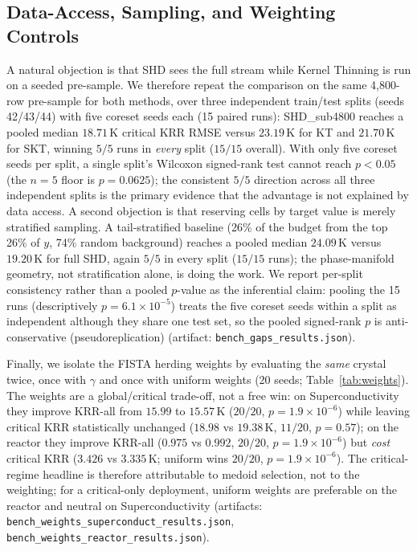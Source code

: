\documentclass[11pt,a4paper]{article}
\begin{document}
\subsection{Data-Access, Sampling, and Weighting Controls}

A natural objection is that SHD sees the full stream while Kernel Thinning is run on a seeded pre-sample. We therefore repeat the comparison on the same 4{,}800-row pre-sample for both methods, over three independent train/test splits (seeds 42/43/44) with five coreset seeds each (15 paired runs): SHD\_sub4800 reaches a pooled median $18.71\,\mathrm{K}$ critical KRR RMSE versus $23.19\,\mathrm{K}$ for KT and $21.70\,\mathrm{K}$ for SKT, winning $5/5$ runs in \emph{every} split ($15/15$ overall). With only five coreset seeds per split, a single split's Wilcoxon signed-rank test cannot reach $p<0.05$ (the $n=5$ floor is $p=0.0625$); the consistent $5/5$ direction across all three independent splits is the primary evidence that the advantage is not explained by data access. A second objection is that reserving cells by target value is merely stratified sampling. A tail-stratified baseline (26\% of the budget from the top 26\% of $y$, 74\% random background) reaches a pooled median $24.09\,\mathrm{K}$ versus $19.20\,\mathrm{K}$ for full SHD, again $5/5$ in every split ($15/15$ runs); the phase-manifold geometry, not stratification alone, is doing the work. We report per-split consistency rather than a pooled $p$-value as the inferential claim: pooling the 15 runs (descriptively $p=6.1\times10^{-5}$) treats the five coreset seeds within a split as independent although they share one test set, so the pooled signed-rank $p$ is anti-conservative (pseudoreplication) (artifact: \texttt{bench\_gaps\_results.json}).

Finally, we isolate the FISTA herding weights by evaluating the \emph{same} crystal twice, once with $\gamma$ and once with uniform weights (20 seeds; Table~\ref{tab:weights}). The weights are a global/critical trade-off, not a free win: on Superconductivity they improve KRR-all from $15.99$ to $15.57\,\mathrm{K}$ ($20/20$, $p=1.9\times10^{-6}$) while leaving critical KRR statistically unchanged ($18.98$ vs $19.38\,\mathrm{K}$, $11/20$, $p=0.57$); on the reactor they improve KRR-all ($0.975$ vs $0.992$, $20/20$, $p=1.9\times10^{-6}$) but \emph{cost} critical KRR ($3.426$ vs $3.335\,\mathrm{K}$; uniform wins $20/20$, $p=1.9\times10^{-6}$). The critical-regime headline is therefore attributable to medoid selection, not to the weighting; for a critical-only deployment, uniform weights are preferable on the reactor and neutral on Superconductivity (artifacts: \texttt{bench\_weights\_superconduct\_results.json}, \texttt{bench\_weights\_reactor\_results.json}).
\end{document}
